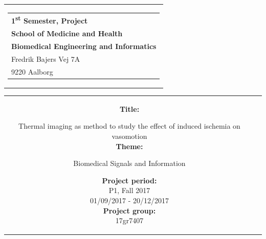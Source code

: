 % 
\thispagestyle{empty}
\begin{titlepage}
\begin{nopagebreak}
{\samepage 

\begin{tabular}{r}
\parbox{\textwidth}{  
\hfill \hspace{2cm} \parbox{8cm}{\begin{tabular}{l} %
{\small \textbf{\textcolor{aaublue}{{1\textsuperscript{st} Semester, Project}}}}\\
{\small \textbf{\textcolor{aaublue}{School of Medicine and Health}}}\\
{\small \textbf{\textcolor{aaublue}{Biomedical Engineering and Informatics}}}\\
{\small \textcolor{aaublue}{Fredrik Bajers Vej 7A}} \\
{\small \textcolor{aaublue}{9220 Aalborg}} \\
\end{tabular}}}
\end{tabular}

\begin{tabular}{cc}
\parbox{7cm}{

\textbf{Title:}

Thermal imaging as method to study the effect of induced ischemia on vasomotion \\ 

\textbf{Theme:}

\small{
 Biomedical Signals and Information\\
}


\parbox{8cm}{


\textbf{Project period:}\\
P1, Fall 2017\\
01/09/2017 - 20/12/2017\\
   
\textbf{Project group:}\\
17gr7407\\ %
  
}}
\end{tabular}}
\end{nopagebreak}
\end{titlepage}
